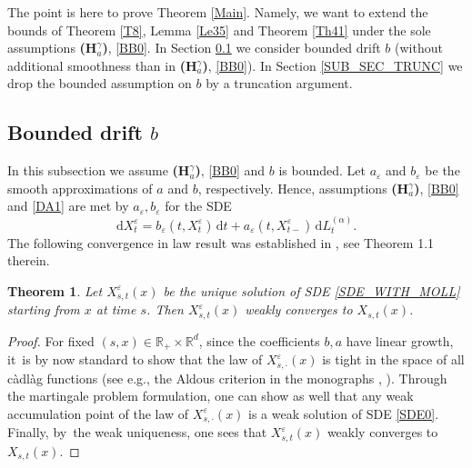 \documentclass[11pt]{article}
\newcommand{\eg}{e.g.,\xspace}
\numberwithin{equation}{section}\providecommand{\asymp}{\mathrel{\sim}}
\newcommand{\rd}{\mathrm{d}}
\theoremstyle{plain}
\newtheorem{theorem}{Theorem}[section]
\theoremstyle{definition}
\let\eps\varepsilon
\newcommand\mR{\mathbb{R}}
\newcommand\1{{\mathbf{1}}}
\newcommand{\dif}{\,\mathrm{d}}
\begin{document}
The point is here to prove Theorem \ref{Main}. Namely, we want to extend the bounds of Theorem \ref{T8}, Lemma \ref{Le35} and Theorem \ref{Th41} under the sole assumptions {\bf (H$^\gamma_a$)}, \eqref{BB0}.
In Section \ref{SUB_SEC_BD} we consider bounded drift $b$ (without additional smoothness than in {\bf (H$^\gamma_a$)}, \eqref{BB0}).
In Section \ref{SUB_SEC_TRUNC} we drop the bounded assumption on $b$ by a truncation argument.
\subsection{Bounded drift $b$}\label{SUB_SEC_BD}
In this subsection we assume {\bf (H$^\gamma_a$)}, \eqref{BB0} and $b$ is bounded.
Let $a_\eps$ and $b_\eps$ be the smooth approximations of $a$ and $b$, respectively. Hence, assumptions {\bf (H$^\gamma_a$)}, \eqref{BB0} and \eqref{DA1} are met by $a_\eps, b_\eps $ for the SDE
\begin{equation}\rd X_t^\eps=b_\eps(t,X_t^\eps)\dif t+a_\eps(t,X_{t-}^\eps)\dif L^{(\alpha)}_t.
\label{SDE_WITH_MOLL}
\end{equation}
The following convergence in law result was established in \cite{CHZ}, see Theorem 1.1 therein.
\begin{theorem}\label{Th62}
Let $X^\eps_{s,t}(x)$ be the unique solution of SDE \eqref{SDE_WITH_MOLL} starting from $x$ at time $s$. Then $X^\eps_{s,t}(x)$ weakly converges to $X_{s,t}(x)$.
\end{theorem}
\begin{proof}
For fixed $(s,x)\in\mR_+\times\mR^d$, since the coefficients $b,a$ {have} linear growth, it~is by now standard to show that the law of
$X^\eps_{s,\cdot}(x)$ is tight in the space of all càdlàg functions ({see \eg the Aldous criterion in the monographs \cite[Ch.\,VI, Th.\,4.5]{jaco:shir:87}, \cite{bass:11}}). {Through the martingale problem formulation}, one can show {as well} that any weak accumulation point of the law of
$X^\eps_{s,\cdot}(x)$ is a weak solution of SDE \eqref{SDE0}. Finally, by~the weak uniqueness, one sees that
$X^\eps_{s,t}(x)$ weakly converges to $X_{s,t}(x)$.
\end{proof}
\end{document}
